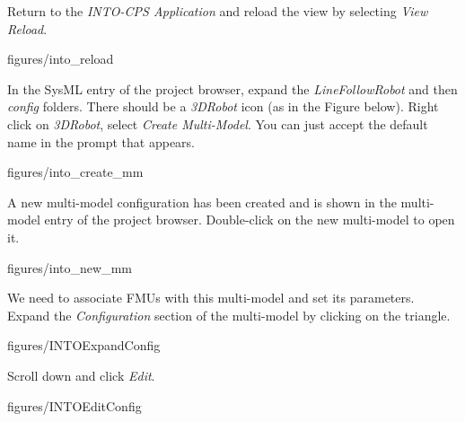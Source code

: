 \documentclass[11pt,a4paper]{../tutorial}
\begin{document}
\begin{instructions}

\item Return to the \emph{INTO-CPS Application} and reload the view by selecting \emph{View \menusep Reload}.

    \begin{annotation}[width=0.5\linewidth,trim=0 700 300 0,clip]{figures/into_reload}
    \end{annotation}

\item In the SysML entry of the project browser, expand the \emph{LineFollowRobot} and then \emph{config} folders. There should be a \emph{3DRobot} icon (as in the Figure below). Right click on \emph{3DRobot}, select \emph{Create Multi-Model}. You can just accept the default name in the prompt that appears.

    \begin{annotation}[width=0.5\linewidth,trim=0 300 300 300,clip]{figures/into_create_mm}
    \end{annotation}

\item A new multi-model configuration has been created and is shown in the multi-model entry of the project browser. Double-click on the new multi-model to open it.

    \begin{annotation}[width=0.85\linewidth,trim=0 400 0 250,clip]{figures/into_new_mm}
    \end{annotation}

\newpage
\item We need to associate FMUs with this multi-model and set its parameters. Expand the \emph{Configuration} section of the multi-model by clicking on the triangle.

    \begin{annotation}[width=0.85\linewidth,trim=0 0 0 250,clip]{figures/INTOExpandConfig}
    \end{annotation}

    \item Scroll down and click \emph{Edit}.

    \begin{annotation}[width=0.85\linewidth,trim=0 0 0 250,clip]{figures/INTOEditConfig}
    \end{annotation}


\end{instructions}
\end{document}
